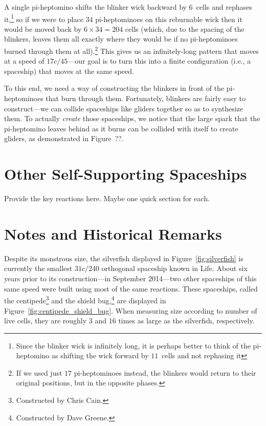 
A single pi-heptomino shifts the blinker wick backward by $6$~cells and rephases it,\footnote{Since the blinker wick is infinitely long, it is perhaps better to think of the pi-heptomino as shifting the wick forward by $11$~cells and not rephasing it} so if we were to place 34 pi-heptominoes on this reburnable wick then it would be moved back by $6 \times 34 = 204$ cells (which, due to the spacing of the blinkers, leaves them all exactly where they would be if no pi-heptominoes burned through them at all).\footnote{If we used just $17$ pi-heptominoes instead, the blinkers would return to their original positions, but in the opposite phases.} This gives us an infinitely-long pattern that moves at a speed of $17c/45$---our goal is to turn this into a finite configuration (i.e., a spaceship) that moves at the same speed.

To this end, we need a way of constructing the blinkers in front of the pi-heptominoes that burn through them. Fortunately, blinkers are fairly easy to construct---we can collide spaceships like gliders together so as to synthesize them. To actually \emph{create} those spaceships, we notice that the large spark that the pi-heptomino leaves behind as it burns can be collided with itself to create gliders, as demonstrated in Figure~??.




\section{Other Self-Supporting Spaceships}\label{sec:other_self_support}

Provide the key reactions here. Maybe one quick section for each.



\section{Notes and Historical Remarks}\label{sec:self_support_history}

Despite its monstrous size, the silverfish displayed in Figure~\ref{fig:silverfish} is currently the smallest $31c/240$ orthogonal spaceship known in Life. About six years prior to its construction---in September 2014---two other spaceships of this same speed were built using most of the same reactions. These spaceships, called the centipede\footnote{Constructed by Chris Cain.} and the shield bug,\footnote{Constructed by Dave Greene.} are displayed in Figure~\ref{fig:centipede_shield_bug}. When measuring size according to number of live cells, they are roughly $3$ and $16$ times as large as the silverfish, respectively.


